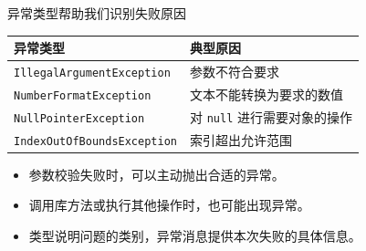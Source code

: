 \documentclass[aspectratio=169]{beamer}
\begin{document}

\begin{frame}{异常类型帮助我们识别失败原因}
  \begin{center}
    \renewcommand{\arraystretch}{1.4}
    \begin{tabular}{ll}
      \textbf{异常类型} & \textbf{典型原因} \\
      \hline
      \texttt{IllegalArgumentException} & 参数不符合要求 \\
      \texttt{NumberFormatException} & 文本不能转换为要求的数值 \\
      \texttt{NullPointerException} & 对 \texttt{null} 进行需要对象的操作 \\
      \texttt{IndexOutOfBoundsException} & 索引超出允许范围 \\
    \end{tabular}
  \end{center}
  \bigskip
  \begin{itemize}
    \item 参数校验失败时，可以主动抛出合适的异常。
    \item 调用库方法或执行其他操作时，也可能出现异常。
    \item 类型说明问题的类别，异常消息提供本次失败的具体信息。
  \end{itemize}
\end{frame}
\end{document}
